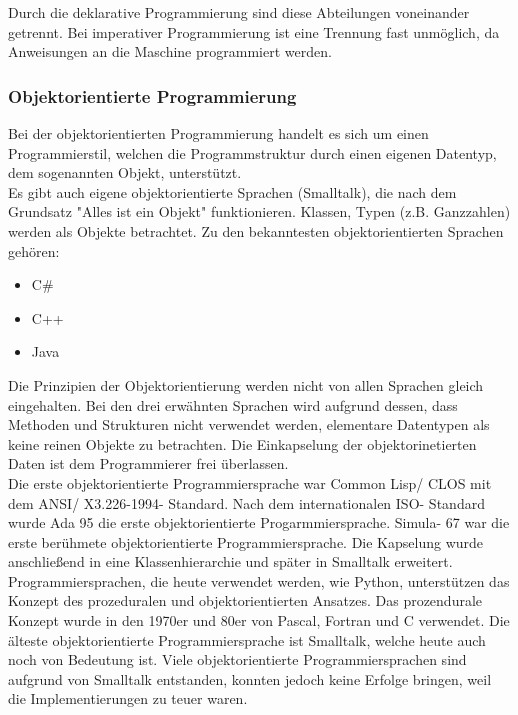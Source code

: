 \documentclass[12pt,a4paper]{report}
\begin{document}
\begin{onehalfspace}
Durch die deklarative Programmierung sind diese Abteilungen voneinander getrennt. Bei imperativer Programmierung ist eine Trennung fast unmöglich, da Anweisungen an die Maschine programmiert werden.

\subsubsection{Objektorientierte Programmierung}
Bei der objektorientierten Programmierung handelt es sich um einen Programmierstil, welchen die Programmstruktur durch einen eigenen Datentyp, dem sogenannten Objekt, unterstützt.\\

Es gibt auch eigene objektorientierte Sprachen (Smalltalk), die nach dem Grundsatz "{}Alles ist ein Objekt"{} funktionieren. Klassen, Typen (z.B. Ganzzahlen) werden als Objekte betrachtet. Zu den bekanntesten objektorientierten Sprachen gehören:
\begin{itemize}
\item C\#
\item C++
\item Java
\end{itemize}
Die Prinzipien der Objektorientierung werden nicht von allen Sprachen gleich eingehalten. Bei den drei erwähnten Sprachen wird aufgrund dessen, dass Methoden und Strukturen nicht verwendet werden, elementare Datentypen als keine reinen Objekte zu betrachten. Die Einkapselung der objektorinetierten Daten ist dem Programmierer frei überlassen.\\

Die erste objektorientierte Programmiersprache war Common Lisp/ CLOS mit dem ANSI/ X3.226-1994- Standard. Nach dem internationalen ISO- Standard wurde Ada 95 die erste objektorientierte Progarmmiersprache.
Simula- 67 war die erste berühmete objektorientierte Programmiersprache. Die Kapselung wurde anschließend in eine Klassenhierarchie und später in Smalltalk erweitert.\\

Programmiersprachen, die heute verwendet werden, wie Python, unterstützen das Konzept des prozeduralen und objektorientierten Ansatzes. Das prozendurale Konzept wurde in den 1970er und 80er von Pascal, Fortran und C verwendet. Die älteste objektorientierte Programmiersprache ist Smalltalk, welche heute auch noch von Bedeutung ist. Viele objektorientierte Programmiersprachen sind aufgrund von Smalltalk entstanden, konnten jedoch keine Erfolge bringen, weil die Implementierungen zu teuer waren.\\


\end{onehalfspace}
\end{document}
